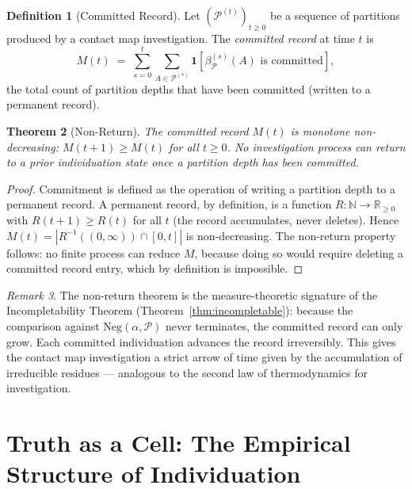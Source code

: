 \documentclass[12pt,a4paper,twocolumn]{article}
\theoremstyle{plain}
\newtheorem{theorem}{Theorem}[section]
\theoremstyle{definition}
\newtheorem{definition}[theorem]{Definition}
\theoremstyle{remark}
\newtheorem{remark}[theorem]{Remark}
\newcommand{\Part}{\mathcal{P}}
\newcommand{\bP}{\beta_{\mathcal{P}}}
\newcommand{\Neg}{\mathrm{Neg}}
\newcommand{\Real}{\mathbb{R}}
\newcommand{\Nat}{\mathbb{N}}
\begin{document}
\begin{definition}[Committed Record]
\label{def:committed-record}
Let $(\Part^{(t)})_{t \geq 0}$ be a sequence of partitions produced by a
contact map investigation.  The \emph{committed record} at time $t$ is
\begin{equation}
  M(t) \;=\; \sum_{s=0}^{t} \sum_{A \in \Part^{(s)}} \mathbf{1}[\bP^{(s)}(A)
    \text{ is committed}],
\end{equation}
the total count of partition depths that have been committed (written to a
permanent record).
\end{definition}

\begin{theorem}[Non-Return]
\label{thm:non-return}
The committed record $M(t)$ is monotone non-decreasing: $M(t+1) \geq M(t)$
for all $t \geq 0$.  No investigation process can return to a prior
individuation state once a partition depth has been committed.
\end{theorem}

\begin{proof}
Commitment is defined as the operation of writing a partition depth to a
permanent record.  A permanent record, by definition, is a function
$R : \Nat \to \Real_{\geq 0}$ with $R(t+1) \geq R(t)$ for all $t$ (the
record accumulates, never deletes).  Hence $M(t) = |R^{-1}((0,\infty)) \cap
[0,t]|$ is non-decreasing.  The non-return property follows: no finite
process can reduce $M$, because doing so would require deleting a committed
record entry, which by definition is impossible.
\end{proof}

\begin{remark}
The non-return theorem is the measure-theoretic signature of the
Incompletability Theorem (Theorem~\ref{thm:incompletable}): because the
comparison against $\Neg(\alpha, \Part)$ never terminates, the committed
record can only grow.  Each committed individuation advances the record
irreversibly.  This gives the contact map investigation a strict arrow of
time given by the accumulation of irreducible residues --- analogous to the
second law of thermodynamics for investigation.
\end{remark}

\section{Truth as a Cell: The Empirical Structure of Individuation}
\label{sec:empirical}
\end{document}
